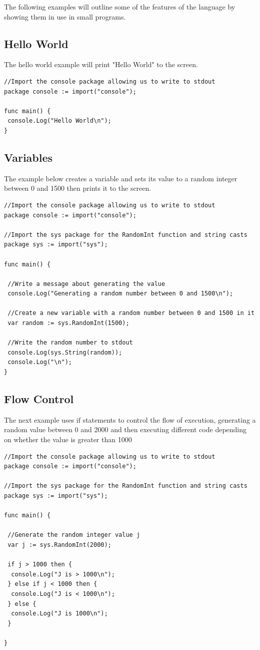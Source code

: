 \documentclass[]{final_report}
\begin{document}
The following examples will outline some of the features of the language by showing them in use in small programs.

\subsection{Hello World}

The hello world example will print "Hello World" to the screen.

\begin{verbatim}
//Import the console package allowing us to write to stdout
package console := import("console");

func main() {
 console.Log("Hello World\n");
}
\end{verbatim}

\subsection{Variables}

The example below creates a variable and sets its value to a random integer between 0 and 1500 then prints it to the screen.

\begin{verbatim}
//Import the console package allowing us to write to stdout
package console := import("console");

//Import the sys package for the RandomInt function and string casts
package sys := import("sys");

func main() {

 //Write a message about generating the value
 console.Log("Generating a random number between 0 and 1500\n");
 
 //Create a new variable with a random number between 0 and 1500 in it
 var random := sys.RandomInt(1500);
 
 //Write the random number to stdout
 console.Log(sys.String(random));
 console.Log("\n");
}
\end{verbatim}


\subsection{Flow Control}

The next example uses if statements to control the flow of execution, generating a random value between 0 and 2000 and then executing different code depending on whether the value is greater than 1000

\begin{verbatim}
//Import the console package allowing us to write to stdout
package console := import("console");

//Import the sys package for the RandomInt function and string casts
package sys := import("sys");

func main() {

 //Generate the random integer value j
 var j := sys.RandomInt(2000);

 if j > 1000 then {
  console.Log("J is > 1000\n");
 } else if j < 1000 then {
  console.Log("J is < 1000\n");
 } else {
  console.Log("J is 1000\n");
 }

}
\end{verbatim}
\end{document}
